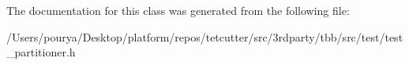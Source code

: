 The documentation for this class was generated from the following file\+:\begin{DoxyCompactItemize}
\item 
/\+Users/pourya/\+Desktop/platform/repos/tetcutter/src/3rdparty/tbb/src/test/test\+\_\+partitioner.\+h\end{DoxyCompactItemize}

